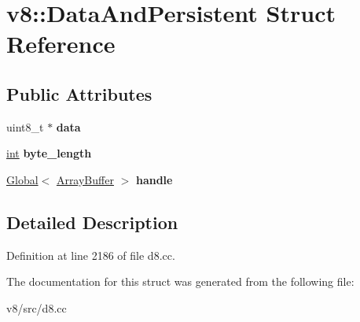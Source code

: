 \hypertarget{structv8_1_1DataAndPersistent}{}\section{v8\+:\+:Data\+And\+Persistent Struct Reference}
\label{structv8_1_1DataAndPersistent}
\subsection*{Public Attributes}
\begin{DoxyCompactItemize}
\item 
\mbox{\label{structv8_1_1DataAndPersistent_a56a66b5345eabc97cf7535b9c2f35e83}} 
uint8\+\_\+t $\ast$ {\bfseries data}
\item 
\mbox{\label{structv8_1_1DataAndPersistent_ac5da91ed58368a7925f804a9c025d9b0}} 
\mbox{\hyperlink{classint}{int}} {\bfseries byte\+\_\+length}
\item 
\mbox{\label{structv8_1_1DataAndPersistent_a7eb39acbec0b503b6321295537e738e6}} 
\mbox{\hyperlink{classv8_1_1Global}{Global}}$<$ \mbox{\hyperlink{classv8_1_1ArrayBuffer}{Array\+Buffer}} $>$ {\bfseries handle}
\end{DoxyCompactItemize}


\subsection{Detailed Description}


Definition at line 2186 of file d8.\+cc.



The documentation for this struct was generated from the following file\+:\begin{DoxyCompactItemize}
\item 
v8/src/d8.\+cc\end{DoxyCompactItemize}
